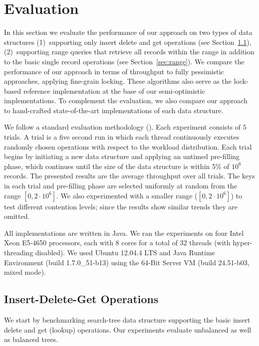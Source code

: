 \section{Evaluation}
\label{sec:eval}

In this section we evaluate the performance of our approach on two types of data
structures (1)~supporting only insert delete and get operations (see
Section~\ref{sec:readwrite}), (2)~supporting range queries that retrieve all
records within the range in addition to the basic single record operations (see
Section~\ref{sec:range}). We compare the performance of our approach in terms of
throughput to fully pessimistic approaches, applying fine-grain locking. These
algorithms also serve as the lock-based reference implementation at the base of
our semi-optimistic implementations. To complement the evaluation, we also
compare our approach to hand-crafted state-of-the-art implementations of each
data structure.         

We follow a standard evaluation methodology
(\cite{DrachslerVY2014,NatarajanM2014,BrownER2014,ArbelA2014}). Each experiment
consists of $5$ trials. A trial is a five second run in which each thread continuously executes
randomly chosen operations with respect to the workload distribution. Each trial
begins by initiating a new data structure and applying an untimed pre-filling
phase, which continues until the size of the data structure is within 5\% of
$10^6$ records. The presented results are the average throughput over all trials.    
The keys in each trial and pre-filling phase are selected uniformly at random
from the range $[0,2\cdot10^6]$.
We also experimented with a smaller range ($[0,2\cdot10^6]$) to test different
contention levels; since the results show similar trends they are omitted. 

All implementations are written in Java. We ran the experiments on four Intel
Xeon E5-4650 processors, each with 8 cores for a total of 32 threads 
(with hyper-threading disabled). 
We used Ubuntu 12.04.4 LTS and Java Runtime Environment (build
1.7.0\_51-b13) using the 64-Bit Server VM (build 24.51-b03, mixed mode).

\subsection{Insert-Delete-Get Operations}
\label{sec:readwrite} 

We start by benchmarking search-tree data structure supporting the basic insert
delete and get (lookup) operations. Our experiments evaluate unbalanced as well
as balanced trees.  

